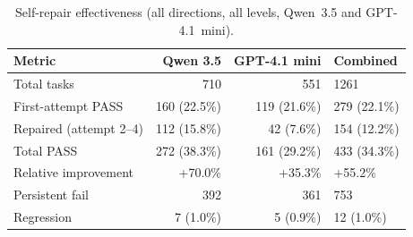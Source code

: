 \begin{table}[htbp]
\centering
\caption{Self-repair effectiveness (all directions, all levels, Qwen~3.5 and GPT-4.1~mini).}
\label{tab:self-repair}
\small
\begin{tabular}{@{}lrrl@{}}
\toprule
Metric & Qwen 3.5 & GPT-4.1 mini & Combined \\
\midrule
Total tasks & 710 & 551 & 1261 \\ %
First-attempt PASS & 160 (22.5\%) & 119 (21.6\%) & 279 (22.1\%) \\ %
Repaired (attempt 2--4) & 112 (15.8\%) & 42 (7.6\%) & 154 (12.2\%) \\ %
Total PASS & 272 (38.3\%) & 161 (29.2\%) & 433 (34.3\%) \\ %
Relative improvement & +70.0\% & +35.3\% & +55.2\% \\ %
Persistent fail & 392 & 361 & 753 \\ %
Regression & 7 (1.0\%) & 5 (0.9\%) & 12 (1.0\%) \\ %
\bottomrule
\end{tabular}
\end{table}


